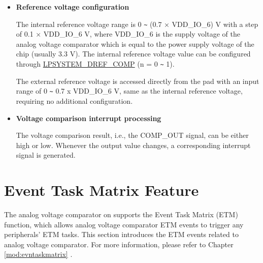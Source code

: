 \documentclass[main\_\_EN.tex]{subfiles}
\begin{document}
\begin{itemize}
          \begin{itemize}
            \item Comparing the main voltage with the external reference voltage.
            \item Comparing the main voltage with the internal reference voltage.
          \end{itemize}
        
          The voltage comparison mode can be configured through \hyperref[fielddesc:LPSYSTEMMODECOMP0]{LPSYSTEM\_MODE\_COMP} ( = 0 \verb+~+ 1).

    \item {\bfseries Reference voltage configuration}

          The internal reference voltage range is 0 \verb+~+ (0.7 × VDD\_IO\_6) V with a step of 0.1 × VDD\_IO\_6 V, where VDD\_IO\_6 is the supply voltage of the analog voltage comparator which is equal to the power supply voltage of the chip (usually 3.3 V). The internal reference voltage value can be configured through \hyperref[fielddesc:LPSYSTEMDREFCOMP0]{LPSYSTEM\_DREF\_COMP} (n = 0 \verb+~+ 1).
        
          The external reference voltage is accessed directly from the pad with an input range of 0 \verb+~+ {0.7 x VDD\_IO\_6} V, same as the internal reference voltage, requiring no additional configuration.

    \item {\bfseries Voltage comparison interrupt processing}
        
          The voltage comparison result, i.e., the COMP\_OUT signal, can be either high or low. Whenever the output value changes, a corresponding interrupt signal is generated.

\end{itemize}



\section{Event Task Matrix Feature}
\label{sec:anacom-etm-func}

The analog voltage comparator on \chipname{} supports the Event Task Matrix (ETM) function, which allows analog voltage comparator ETM events to trigger any peripherals' ETM tasks. This section introduces the ETM events related to analog voltage comparator. For more information, please refer to Chapter \ref{mod:evntaskmatrix} .
\end{document}
